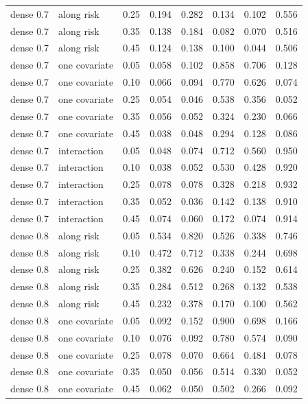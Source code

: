 \begin{table}[htbp]
\begin{tabular}{lllrrrrr}
dense 0.7 & along risk & 0.25 & 0.194 & 0.282 & 0.134 & 0.102 & 0.556 \\
dense 0.7 & along risk & 0.35 & 0.138 & 0.184 & 0.082 & 0.070 & 0.516 \\
dense 0.7 & along risk & 0.45 & 0.124 & 0.138 & 0.100 & 0.044 & 0.506 \\
\addlinespace
dense 0.7 & one covariate & 0.05 & 0.058 & 0.102 & 0.858 & 0.706 & 0.128 \\
dense 0.7 & one covariate & 0.10 & 0.066 & 0.094 & 0.770 & 0.626 & 0.074 \\
dense 0.7 & one covariate & 0.25 & 0.054 & 0.046 & 0.538 & 0.356 & 0.052 \\
dense 0.7 & one covariate & 0.35 & 0.056 & 0.052 & 0.324 & 0.230 & 0.066 \\
dense 0.7 & one covariate & 0.45 & 0.038 & 0.048 & 0.294 & 0.128 & 0.086 \\
\addlinespace
dense 0.7 & interaction & 0.05 & 0.048 & 0.074 & 0.712 & 0.560 & 0.950 \\
dense 0.7 & interaction & 0.10 & 0.038 & 0.052 & 0.530 & 0.428 & 0.920 \\
dense 0.7 & interaction & 0.25 & 0.078 & 0.078 & 0.328 & 0.218 & 0.932 \\
dense 0.7 & interaction & 0.35 & 0.052 & 0.036 & 0.142 & 0.138 & 0.910 \\
dense 0.7 & interaction & 0.45 & 0.074 & 0.060 & 0.172 & 0.074 & 0.914 \\
\addlinespace
dense 0.8 & along risk & 0.05 & 0.534 & 0.820 & 0.526 & 0.338 & 0.746 \\
dense 0.8 & along risk & 0.10 & 0.472 & 0.712 & 0.338 & 0.244 & 0.698 \\
dense 0.8 & along risk & 0.25 & 0.382 & 0.626 & 0.240 & 0.152 & 0.614 \\
dense 0.8 & along risk & 0.35 & 0.284 & 0.512 & 0.268 & 0.132 & 0.538 \\
dense 0.8 & along risk & 0.45 & 0.232 & 0.378 & 0.170 & 0.100 & 0.562 \\
\addlinespace
dense 0.8 & one covariate & 0.05 & 0.092 & 0.152 & 0.900 & 0.698 & 0.166 \\
dense 0.8 & one covariate & 0.10 & 0.076 & 0.092 & 0.780 & 0.574 & 0.090 \\
dense 0.8 & one covariate & 0.25 & 0.078 & 0.070 & 0.664 & 0.484 & 0.078 \\
dense 0.8 & one covariate & 0.35 & 0.050 & 0.056 & 0.514 & 0.330 & 0.052 \\
dense 0.8 & one covariate & 0.45 & 0.062 & 0.050 & 0.502 & 0.266 & 0.092 \\

\end{tabular}
\end{table}
